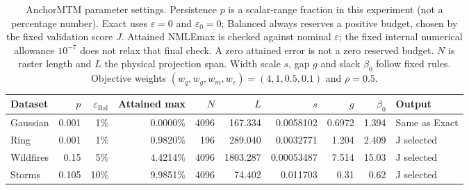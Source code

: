 \begin{table}[t]
\centering
\caption{AnchorMTM parameter settings. Persistence $p$ is a scalar-range fraction in this experiment (not a percentage number). Exact uses $\varepsilon=0$ and $\varepsilon_0=0$; Balanced always reserves a positive budget, chosen by the fixed validation score $J$. Attained NMLEmax is checked against nominal $\varepsilon$; the fixed internal numerical allowance $10^{-7}$ does not relax that final check. A zero attained error is not a zero reserved budget. $N$ is raster length and $L$ the physical projection span. Width scale $s$, gap $g$ and slack $\beta_0$ follow fixed rules. Objective weights $(w_q,w_g,w_m,w_e)=(4,1,0.5,0.1)$ and $\rho=0.5$.}
\label{tab:anchor-parameters-final}
\small
\setlength{\tabcolsep}{4pt}
\begin{tabular}{lrrrrrrrrl}
\toprule
Dataset & $p$ & $\varepsilon_{\mathrm{Bal}}$ & Attained max & $N$ & $L$ & $s$ & $g$ & $\beta_0$ & Output \\
\midrule
Gaussian & 0.001 & 1\% & 0.0000\% & 4096 & 167.334 & 0.0058102 & 0.6972 & 1.394 & Same as Exact \\
Ring & 0.001 & 1\% & 0.9820\% & 196 & 289.040 & 0.0032771 & 1.204 & 2.409 & J selected \\
Wildfires & 0.15 & 5\% & 4.4214\% & 4096 & 1803.287 & 0.00053487 & 7.514 & 15.03 & J selected \\
Storms & 0.105 & 10\% & 9.9851\% & 4096 & 74.402 & 0.011703 & 0.31 & 0.62 & J selected \\
\bottomrule
\end{tabular}
\end{table}
